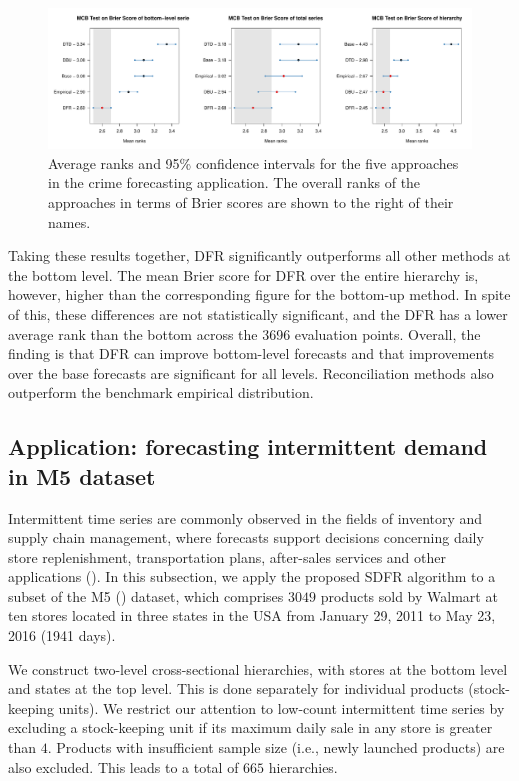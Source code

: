 \documentclass[a4paper,review,11pt,authoryear]{elsarticle}
\theoremstyle{definition}
\begin{document}
     \begin{figure}[h]
       \caption{\label{fig:application_crime}Average ranks and 95\% confidence intervals for the five approaches in the crime forecasting application. The overall ranks of the approaches in terms of Brier scores are shown to the right of their names.}
       \centering
       \includegraphics[width=\textwidth]{figures/dc_crime_mcb.pdf}
     \end{figure}


     Taking these results together, DFR significantly outperforms all other methods at the bottom level. The mean Brier score for DFR over the entire hierarchy is, however, higher than the corresponding figure for the bottom-up method. In spite of this, these differences are not statistically significant, and the DFR has a lower average rank than the bottom across the 3696 evaluation points. Overall, the finding is that DFR can improve bottom-level forecasts and that improvements over the base forecasts are significant for all levels. Reconciliation methods also outperform the benchmark empirical distribution.
     
     \subsection{Application: forecasting intermittent demand in M5 dataset}
     \label{sec:M5}

     Intermittent time series are commonly observed in the fields of inventory and supply chain management, where forecasts support decisions concerning daily store replenishment, transportation plans, after-sales services and other applications (\citealp{babaiDemandForecastingSupply2022}). In this subsection, we apply the proposed SDFR algorithm to a subset of the M5 (\citealp{makridakisM5AccuracyCompetition2022}) dataset, which comprises $3049$ products sold by Walmart at ten stores located in three states in the USA from January 29, 2011 to May 23, 2016 (1941 days).
     
     We construct two-level cross-sectional hierarchies, with stores at the bottom level and states at the top level. This is done separately for individual products (stock-keeping units). We restrict our attention to low-count intermittent time series by excluding a stock-keeping unit if its maximum daily sale in any store is greater than $4$. Products with insufficient sample size (i.e., newly launched products) are also excluded. This leads to a total of $665$ hierarchies.
     
\end{document}
